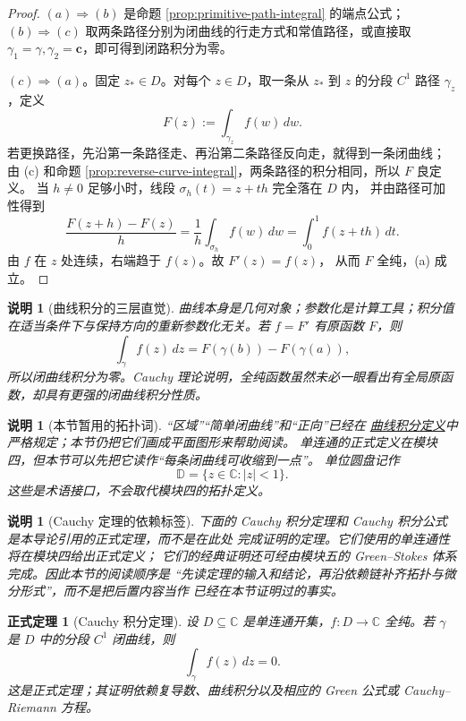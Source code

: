 \documentclass[UTF8,fontset=none,a4paper,11pt]{ctexart}
\theoremstyle{foundation-definition}
\theoremstyle{foundation-theorem}
\newtheorem{theorem}[definition]{正式定理}
\theoremstyle{foundation-proposition}
\theoremstyle{foundation-example}
\theoremstyle{foundation-remark}
\newtheorem{remark}[definition]{说明}
\theoremstyle{foundation-theorem}
\newcommand{\C}{\mathbb C}
\newcommand{\term}[2]{\hyperref[#1]{#2}}
\begin{document}
\begin{proof}
\((a)\Rightarrow(b)\) 是命题 \ref{prop:primitive-path-integral} 的端点公式；
\((b)\Rightarrow(c)\) 取两条路径分别为闭曲线的行走方式和常值路径，或直接取
\(\gamma_1=\gamma,\gamma_2=\mathbf c\)，即可得到闭路积分为零。

\((c)\Rightarrow(a)\)。固定 \(z_\ast\in D\)。对每个 \(z\in D\)，取一条从
\(z_\ast\) 到 \(z\) 的分段 \(C^1\) 路径 \(\gamma_z\)，定义
\[
F(z):=\int_{\gamma_z}f(w)\,dw.
\]
若更换路径，先沿第一条路径走、再沿第二条路径反向走，就得到一条闭曲线；
由 (c) 和命题 \ref{prop:reverse-curve-integral}，两条路径的积分相同，所以 \(F\) 良定义。
当 \(h\neq0\) 足够小时，线段 \(\sigma_h(t)=z+th\) 完全落在 \(D\) 内，
并由路径可加性得到
\[
\frac{F(z+h)-F(z)}{h}
=\frac1h\int_{\sigma_h}f(w)\,dw
=\int_0^1 f(z+th)\,dt.
\]
由 \(f\) 在 \(z\) 处连续，右端趋于 \(f(z)\)。故 \(F'(z)=f(z)\)，
从而 \(F\) 全纯，(a) 成立。
\end{proof}

\begin{remark}[曲线积分的三层直觉]
曲线本身是几何对象；参数化是计算工具；积分值在适当条件下与保持方向的重新参数化无关。若 \(f=F'\) 有原函数 \(F\)，则
\[
\int_\gamma f(z)\,dz=F(\gamma(b))-F(\gamma(a)),
\]
所以闭曲线积分为零。Cauchy 理论说明，全纯函数虽然未必一眼看出有全局原函数，却具有更强的闭曲线积分性质。
\end{remark}

\begin{remark}[本节暂用的拓扑词]\label{rem:complex-topology-preview}
“区域”“简单闭曲线”和“正向”已经在
\term{def:complex-line-integral}{曲线积分定义}中严格规定；本节仍把它们画成平面图形来帮助阅读。
单连通的正式定义在模块四，但本节可以先把它读作“每条闭曲线可收缩到一点”。
单位圆盘记作
\[
\mathbb D=\{z\in\mathbb C:|z|<1\}.
\]
这些是术语接口，不会取代模块四的拓扑定义。
\end{remark}

\begin{remark}[Cauchy 定理的依赖标签]
下面的 Cauchy 积分定理和 Cauchy 积分公式是本导论引用的正式定理，而不是在此处
完成证明的定理。它们使用的单连通性将在模块四给出正式定义；
它们的经典证明还可经由模块五的 Green--Stokes 体系完成。因此本节的阅读顺序是
“先读定理的输入和结论，再沿依赖链补齐拓扑与微分形式”，而不是把后置内容当作
已经在本节证明过的事实。
\end{remark}

\begin{theorem}[Cauchy 积分定理]\label{thm:cauchy-integral-theorem}
设 \(D\subseteq\C\) 是单连通开集，\(f:D\to\C\) 全纯。若 \(\gamma\) 是 \(D\) 中的分段 \(C^1\) 闭曲线，则
\[
\int_\gamma f(z)\,dz=0.
\]
这是正式定理；其证明依赖复导数、曲线积分以及相应的 Green 公式或 Cauchy--Riemann 方程。
\end{theorem}
\end{document}

